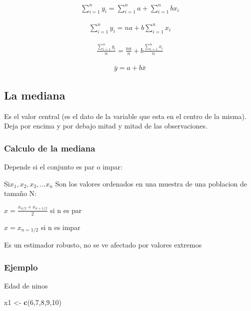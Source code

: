 \documentclass[twocolumn]{article}
\newenvironment{Shaded}{\begin{snugshade}}{\end{snugshade}}
\newcommand{\KeywordTok}[1]{\textcolor[rgb]{0.13,0.29,0.53}{\textbf{#1}}}
\newcommand{\DecValTok}[1]{\textcolor[rgb]{0.00,0.00,0.81}{#1}}
\newcommand{\StringTok}[1]{\textcolor[rgb]{0.31,0.60,0.02}{#1}}
\newcommand{\NormalTok}[1]{#1}
\begin{document}
\begin{align}
\sum_{i= 1}^n y_i = \sum_{i=1}^n a + \sum_{i=1}^n b x_i
\end{align}

\begin{align}
\sum_{i= 1}^n y_i = na + b \sum_{i=1}^n  x_i
\end{align}

\begin{align}
\frac{\sum_{i= 1}^n y_i}{n} = \frac{na}{n} +b \frac{ \sum_{i=1}^n  x_i}{n}
\end{align}

\begin{align}
\bar{y} = a + b \bar{x} 
\end{align}

\subsection{La mediana}\label{la-mediana}

Es el valor central (es el dato de la variable que esta en el centro de
la misma). Deja por encima y por debajo mitad y mitad de las
observaciones.

\subsubsection{Calculo de la mediana}\label{calculo-de-la-mediana}

Depende si el conjunto es par o impar:

Si\(x_1, x_2, x_3,...x_n\) Son los valores ordenados en una muestra de
una poblacion de tamaño N:

\(\hat{x} = \frac{x_{n/2}+x_{n+1/2} }{2}\) si n es par

\(\hat{x} = x_{n=1/2}\) si n es impar

Es un estimador robusto, no se ve afectado por valores extremos

\subsubsection{Ejemplo}\label{ejemplo}

Edad de ninos

\begin{Shaded}
\begin{Highlighting}[]
\NormalTok{x1 <-}\StringTok{ }\KeywordTok{c}\NormalTok{(}\DecValTok{6}\NormalTok{,}\DecValTok{7}\NormalTok{,}\DecValTok{8}\NormalTok{,}\DecValTok{9}\NormalTok{,}\DecValTok{10}\NormalTok{)}
\end{Highlighting}
\end{Shaded}
\end{document}
